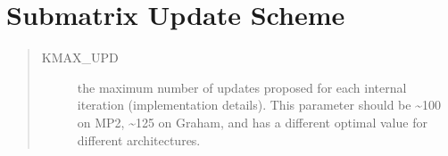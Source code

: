 \documentclass[letterpaper,10pt,english]{sphinxmanual}
\begin{document}
\section{Submatrix Update Scheme}
\label{\detokenize{params:submatrix-update-scheme}}\begin{quote}
\begin{description}
\item[{KMAX\_UPD}] \leavevmode
the maximum number of updates proposed for each internal iteration (implementation details).
This parameter should be \textasciitilde{}100 on MP2, \textasciitilde{}125 on Graham, and has a different optimal value for different architectures.

\end{description}
\end{quote}



\renewcommand{\indexname}{Index}
\printindex
\end{document}
